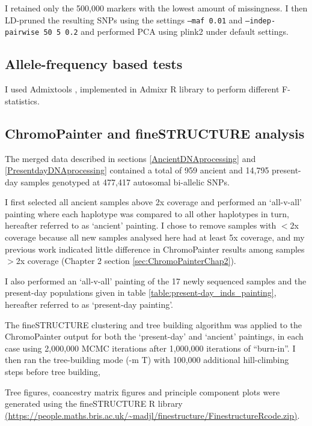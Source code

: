 I retained only the 500,000 markers with the lowest amount of missingness. I then LD-pruned the resulting SNPs using the settings \texttt{--maf 0.01} and \texttt{--indep-pairwise 50 5 0.2} and performed PCA using plink2 under default settings. 

\subsection{Allele-frequency based tests}

I used Admixtools \cite{Patterson2012}, implemented in Admixr R library \cite{admixrpetr2019} to perform  different F-statistics.

\subsection{ChromoPainter and fineSTRUCTURE analysis}

The merged data described in sections \ref{AncientDNAprocessing} and \ref{PresentdayDNAprocessing} contained a total of 959 ancient and 14,795 present-day samples genotyped at 477,417 autosomal bi-allelic SNPs.

I first selected all ancient samples above 2x coverage and performed an `all-v-all' painting where each haplotype was compared to all other haplotypes in turn, hereafter referred to as `ancient' painting. I chose to remove samples with $<$2x coverage because all new samples analysed here had at least 5x coverage, and my previous work indicated little difference in ChromoPainter results among samples $>$2x coverage (Chapter 2 section \ref{sec:ChromoPainterChap2}). 

I also performed an `all-v-all' painting of the 17 newly sequenced samples and the present-day populations given in table \ref{table:present-day_inds_painting}, hereafter referred to as `present-day painting'.


The fineSTRUCTURE \cite{Lawson2012} clustering and tree building algorithm was applied to the ChromoPainter output for both the `present-day' and `ancient' paintings, in each case using 2,000,000 MCMC iterations after 1,000,000 iterations of ``burn-in''. I then ran the tree-building mode (-m T) with 100,000 additional hill-climbing steps before tree building,

Tree figures, coancestry matrix figures and principle component plots were generated using the fineSTRUCTURE R library \url{(https://people.maths.bris.ac.uk/~madjl/finestructure/FinestructureRcode.zip)}.

